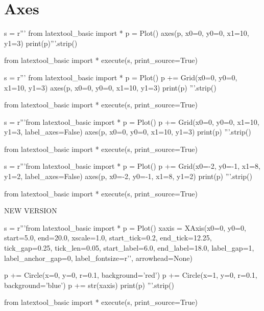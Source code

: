 \section{Axes}
\begin{python}
s = r'''
from latextool_basic import *
p = Plot()
axes(p, x0=0, y0=0, x1=10, y1=3)
print(p)'''.strip()

from latextool_basic import *
execute(s, print_source=True)
\end{python}

\begin{python}
s = r'''
from latextool_basic import *
p = Plot()
p += Grid(x0=0, y0=0, x1=10, y1=3)
axes(p, x0=0, y0=0, x1=10, y1=3)
print(p)
'''.strip()

from latextool_basic import *
execute(s, print_source=True)
\end{python}

\begin{python}
s = r'''from latextool_basic import *
p = Plot()
p += Grid(x0=0, y0=0, x1=10, y1=3, label_axes=False)
axes(p, x0=0, y0=0, x1=10, y1=3)
print(p)
'''.strip()

from latextool_basic import *
execute(s, print_source=True)
\end{python}

\begin{python}
s = r'''from latextool_basic import *
p = Plot()
p += Grid(x0=-2, y0=-1, x1=8, y1=2, label_axes=False)
axes(p, x0=-2, y0=-1, x1=8, y1=2)
print(p)
'''.strip()

from latextool_basic import *
execute(s, print_source=True)
\end{python}

\newpage
NEW VERSION

\begin{python}
s = r'''from latextool_basic import *
p = Plot()
xaxis = XAxis(x0=0, y0=0,
              start=5.0, end=20.0,
              xscale=1.0,          
              start_tick=0.2, end_tick=12.25, 
              tick_gap=0.25,                 
              tick_len=0.05,
              start_label=6.0, end_label=18.0,
              label_gap=1,                      
              label_anchor_gap=0,               
              label_fontsize=r'\small',
              arrowhead=None)

p += Circle(x=0, y=0, r=0.1, background='red')
p += Circle(x=1, y=0, r=0.1, background='blue')
p += str(xaxis)              
print(p)
'''.strip()

from latextool_basic import *
execute(s, print_source=True)
\end{python}
